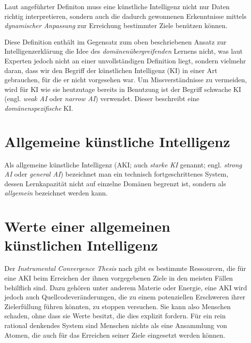 Laut angeführter Definiton muss eine künstliche Intelligenz nicht nur Daten richtig interpretieren, sondern auch die dadurch gewonnenen Erkenntnisse mittels \emph{dynamischer Anpassung} zur Erreichung bestimmter Ziele benützen können.

Diese Definition enthält im Gegensatz zum oben beschriebenen Ansatz zur Intelligenzerklärung die Idee des \emph{domänenübergreifenden} Lernens nicht, was laut Experten jedoch nicht an einer unvollständigen Definition liegt, sondern vielmehr daran, dass wir den Begriff der künstlichen Intelligenz (KI) in einer Art gebrauchen, für die er nicht vorgesehen war. Um Missverständnisse zu vermeiden, wird für KI wie sie heutzutage bereits in Benutzung ist der Begriff schwache KI (engl. \emph{weak AI} oder \emph{narrow AI}) verwendet.  Dieser beschreibt eine \emph{domänenspezifische} KI.

\section{Allgemeine künstliche Intelligenz}
Als allgemeine künstliche Intelligenz (AKI; auch \emph{starke KI} genannt; engl. \emph{strong AI} oder \emph{general AI}) bezeichnet man ein technisch fortgeschrittenes System, dessen Lernkapazität nicht auf einzelne Domänen begrenzt ist, sondern als \emph{allgemein} bezeichnet werden kann. 

\section{Werte einer allgemeinen künstlichen Intelligenz}  \label{Werte}

Der \emph{Instrumental Convergence Thesis}  nach gibt es bestimmte Ressourcen, die für eine AKI beim Erreichen der ihnen vorgegebenen Ziele in den meisten Fällen behilflich sind. Dazu gehören unter anderem Materie oder Energie, eine AKI wird jedoch auch Quellcodeveränderungen, die zu einem potenziellen Erschweren ihrer Zielerfüllung führen könnten, zu stoppen versuchen. Sie kann also Menschen schaden, ohne dass sie Werte besitzt, die dies explizit fordern. Für ein rein rational denkendes System sind Menschen nichts als eine Ansammlung von Atomen, die auch für das Erreichen seiner Ziele eingesetzt werden können.

